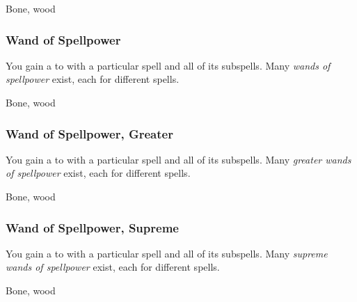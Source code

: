  Bone, wood


\lowercase{\hypertarget{item:Wand of Spellpower}{}}\label{item:Wand of Spellpower}
\hypertarget{item:Wand of Spellpower}{\subsubsection{Wand of Spellpower\hfill{}}}

You gain a   to  with a particular spell and all of its subspells.
Many \textit{wands of spellpower} exist, each for different spells.



 


 Bone, wood


\lowercase{\hypertarget{item:Wand of Spellpower, Greater}{}}\label{item:Wand of Spellpower, Greater}
\hypertarget{item:Wand of Spellpower, Greater}{\subsubsection{Wand of Spellpower, Greater\hfill{}}}

You gain a   to  with a particular spell and all of its subspells.
Many \textit{greater wands of spellpower} exist, each for different spells.



 


 Bone, wood


\lowercase{\hypertarget{item:Wand of Spellpower, Supreme}{}}\label{item:Wand of Spellpower, Supreme}
\hypertarget{item:Wand of Spellpower, Supreme}{\subsubsection{Wand of Spellpower, Supreme\hfill{}}}

You gain a   to  with a particular spell and all of its subspells.
Many \textit{supreme wands of spellpower} exist, each for different spells.



 


 Bone, wood
